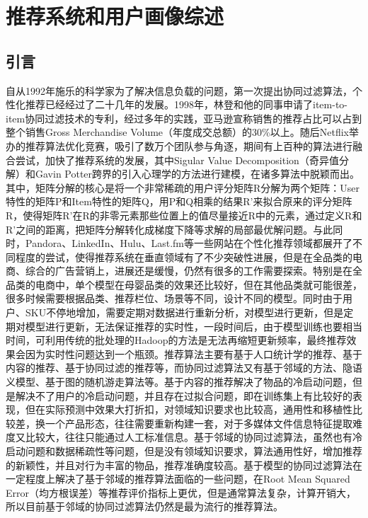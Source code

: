 \chapter{推荐系统和用户画像综述}
	\section{引言}
	自从1992年施乐的科学家为了解决信息负载的问题，第一次提出协同过滤算法，个性化推荐已经经过了二十几年的发展。1998年，林登和他的同事申请了item-to-item协同过滤技术的专利，经过多年的实践，亚马逊宣称销售的推荐占比可以占到整个销售Gross Merchandise Volume（年度成交总额）的30\%以上。随后Netflix举办的推荐算法优化竞赛，吸引了数万个团队参与角逐，期间有上百种的算法进行融合尝试，加快了推荐系统的发展，其中Sigular Value Decomposition（奇异值分解）和Gavin Potter跨界的引入心理学的方法进行建模，在诸多算法中脱颖而出。其中，矩阵分解的核心是将一个非常稀疏的用户评分矩阵R分解为两个矩阵：User特性的矩阵P和Item特性的矩阵Q，用P和Q相乘的结果R'来拟合原来的评分矩阵R，使得矩阵R'在R的非零元素那些位置上的值尽量接近R中的元素，通过定义R和R'之间的距离，把矩阵分解转化成梯度下降等求解的局部最优解问题。与此同时，Pandora、LinkedIn、Hulu、Last.fm等一些网站在个性化推荐领域都展开了不同程度的尝试，使得推荐系统在垂直领域有了不少突破性进展，但是在全品类的电商、综合的广告营销上，进展还是缓慢，仍然有很多的工作需要探索。特别是在全品类的电商中，单个模型在母婴品类的效果还比较好，但在其他品类就可能很差，很多时候需要根据品类、推荐栏位、场景等不同，设计不同的模型。同时由于用户、SKU不停地增加，需要定期对数据进行重新分析，对模型进行更新，但是定期对模型进行更新，无法保证推荐的实时性，一段时间后，由于模型训练也要相当时间，可利用传统的批处理的Hadoop的方法是无法再缩短更新频率，最终推荐效果会因为实时性问题达到一个瓶颈。推荐算法主要有基于人口统计学的推荐、基于内容的推荐、基于协同过滤的推荐等，而协同过滤算法又有基于邻域的方法、隐语义模型、基于图的随机游走算法等。基于内容的推荐解决了物品的冷启动问题，但是解决不了用户的冷启动问题，并且存在过拟合问题，即在训练集上有比较好的表现，但在实际预测中效果大打折扣，对领域知识要求也比较高，通用性和移植性比较差，换一个产品形态，往往需要重新构建一套，对于多媒体文件信息特征提取难度又比较大，往往只能通过人工标准信息。基于邻域的协同过滤算法，虽然也有冷启动问题和数据稀疏性等问题，但是没有领域知识要求，算法通用性好，增加推荐的新颖性，并且对行为丰富的物品，推荐准确度较高。基于模型的协同过滤算法在一定程度上解决了基于邻域的推荐算法面临的一些问题，在Root Mean Squared Error（均方根误差）等推荐评价指标上更优，但是通常算法复杂，计算开销大，所以目前基于邻域的协同过滤算法仍然是最为流行的推荐算法。

